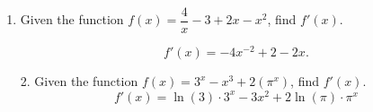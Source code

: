 \documentclass[11pt]{article}
\begin{document}
\pagestyle{empty}
\newsavebox{\quizfront}
\begin{lrbox}{\quizfront}
\begin{minipage}[top][4.5in][t]{\textwidth} \setlength{\parindent}{1.5em}
\drawtitle
\vspace{-0.5in}
\begin{enumerate}

\item Given the function $f(x) = \dfrac{4}{x} - 3 + 2x -x^2$,   
  find $f'(x)$.

  \vfill
  {\color{blue}
    \[
    f'(x) = -4x^{-2}+2-2x.
    \]
  }
  \vfill

\end{enumerate}
\end{minipage}
\end{lrbox}

\newsavebox{\quizback}
\begin{lrbox}{\quizback}
\begin{minipage}[top][4.5in][t]{\textwidth} \setlength{\parindent}{1.5em}
\begin{enumerate}
\item[2.] Given the function $f(x) = 3^x - x^3 + 2(\pi^x)$, find
  $f'(x)$.
  \vfill
  {\color{blue}
    \[
    f'(x) = \ln(3)\cdot 3^x - 3x^2 + 2\ln(\pi)\cdot\pi^x
    \]
  }
  \vfill

\end{enumerate}
\end{minipage}
\end{lrbox}

\noindent \usebox{\quizfront}
\vfill
\noindent \usebox{\quizback}

\end{document}
